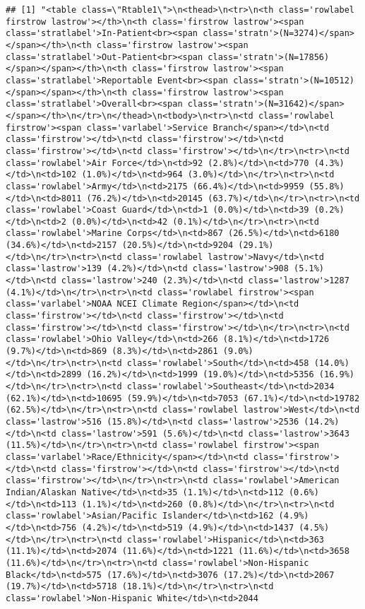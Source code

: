 \documentclass[
]{article}
\begin{document}
\begin{verbatim}
## [1] "<table class=\"Rtable1\">\n<thead>\n<tr>\n<th class='rowlabel firstrow lastrow'></th>\n<th class='firstrow lastrow'><span class='stratlabel'>In-Patient<br><span class='stratn'>(N=3274)</span></span></th>\n<th class='firstrow lastrow'><span class='stratlabel'>Out-Patient<br><span class='stratn'>(N=17856)</span></span></th>\n<th class='firstrow lastrow'><span class='stratlabel'>Reportable Event<br><span class='stratn'>(N=10512)</span></span></th>\n<th class='firstrow lastrow'><span class='stratlabel'>Overall<br><span class='stratn'>(N=31642)</span></span></th>\n</tr>\n</thead>\n<tbody>\n<tr>\n<td class='rowlabel firstrow'><span class='varlabel'>Service Branch</span></td>\n<td class='firstrow'></td>\n<td class='firstrow'></td>\n<td class='firstrow'></td>\n<td class='firstrow'></td>\n</tr>\n<tr>\n<td class='rowlabel'>Air Force</td>\n<td>92 (2.8%)</td>\n<td>770 (4.3%)</td>\n<td>102 (1.0%)</td>\n<td>964 (3.0%)</td>\n</tr>\n<tr>\n<td class='rowlabel'>Army</td>\n<td>2175 (66.4%)</td>\n<td>9959 (55.8%)</td>\n<td>8011 (76.2%)</td>\n<td>20145 (63.7%)</td>\n</tr>\n<tr>\n<td class='rowlabel'>Coast Guard</td>\n<td>1 (0.0%)</td>\n<td>39 (0.2%)</td>\n<td>2 (0.0%)</td>\n<td>42 (0.1%)</td>\n</tr>\n<tr>\n<td class='rowlabel'>Marine Corps</td>\n<td>867 (26.5%)</td>\n<td>6180 (34.6%)</td>\n<td>2157 (20.5%)</td>\n<td>9204 (29.1%)</td>\n</tr>\n<tr>\n<td class='rowlabel lastrow'>Navy</td>\n<td class='lastrow'>139 (4.2%)</td>\n<td class='lastrow'>908 (5.1%)</td>\n<td class='lastrow'>240 (2.3%)</td>\n<td class='lastrow'>1287 (4.1%)</td>\n</tr>\n<tr>\n<td class='rowlabel firstrow'><span class='varlabel'>NOAA NCEI Climate Region</span></td>\n<td class='firstrow'></td>\n<td class='firstrow'></td>\n<td class='firstrow'></td>\n<td class='firstrow'></td>\n</tr>\n<tr>\n<td class='rowlabel'>Ohio Valley</td>\n<td>266 (8.1%)</td>\n<td>1726 (9.7%)</td>\n<td>869 (8.3%)</td>\n<td>2861 (9.0%)</td>\n</tr>\n<tr>\n<td class='rowlabel'>South</td>\n<td>458 (14.0%)</td>\n<td>2899 (16.2%)</td>\n<td>1999 (19.0%)</td>\n<td>5356 (16.9%)</td>\n</tr>\n<tr>\n<td class='rowlabel'>Southeast</td>\n<td>2034 (62.1%)</td>\n<td>10695 (59.9%)</td>\n<td>7053 (67.1%)</td>\n<td>19782 (62.5%)</td>\n</tr>\n<tr>\n<td class='rowlabel lastrow'>West</td>\n<td class='lastrow'>516 (15.8%)</td>\n<td class='lastrow'>2536 (14.2%)</td>\n<td class='lastrow'>591 (5.6%)</td>\n<td class='lastrow'>3643 (11.5%)</td>\n</tr>\n<tr>\n<td class='rowlabel firstrow'><span class='varlabel'>Race/Ethnicity</span></td>\n<td class='firstrow'></td>\n<td class='firstrow'></td>\n<td class='firstrow'></td>\n<td class='firstrow'></td>\n</tr>\n<tr>\n<td class='rowlabel'>American Indian/Alaskan Native</td>\n<td>35 (1.1%)</td>\n<td>112 (0.6%)</td>\n<td>113 (1.1%)</td>\n<td>260 (0.8%)</td>\n</tr>\n<tr>\n<td class='rowlabel'>Asian/Pacific Islander</td>\n<td>162 (4.9%)</td>\n<td>756 (4.2%)</td>\n<td>519 (4.9%)</td>\n<td>1437 (4.5%)</td>\n</tr>\n<tr>\n<td class='rowlabel'>Hispanic</td>\n<td>363 (11.1%)</td>\n<td>2074 (11.6%)</td>\n<td>1221 (11.6%)</td>\n<td>3658 (11.6%)</td>\n</tr>\n<tr>\n<td class='rowlabel'>Non-Hispanic Black</td>\n<td>575 (17.6%)</td>\n<td>3076 (17.2%)</td>\n<td>2067 (19.7%)</td>\n<td>5718 (18.1%)</td>\n</tr>\n<tr>\n<td class='rowlabel'>Non-Hispanic White</td>\n<td>2044 
\end{verbatim}
\end{document}

